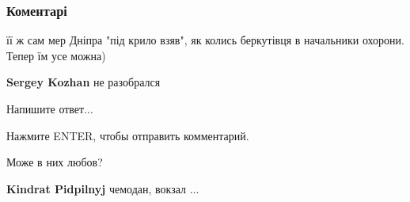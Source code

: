  
 
 
 
 
\subsubsection{Коментарі}

\begin{itemize} %
 
її ж сам мер Дніпра "під крило взяв", як колись беркутівця в начальники охорони. Тепер їм усе можна)

 
\textbf{Sergey Kozhan} не разобрался

Напишите ответ...

Нажмите ENTER, чтобы отправить комментарий.
 
Може в них любов?

 
\textbf{Kindrat Pidpilnyj} чемодан, вокзал ...


 

\end{itemize}
